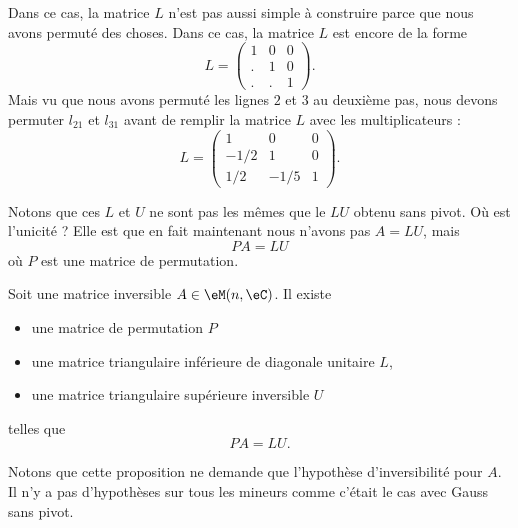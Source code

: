 Dans ce cas, la matrice \( L\) n'est pas aussi simple à construire parce que nous avons permuté des choses. Dans ce cas, la matrice \( L\) est encore de la forme
\begin{equation}
    L=\begin{pmatrix}
        1    &   0    &   0    \\
        .    &   1    &   0    \\
        .    &   .    &   1
    \end{pmatrix}.
\end{equation}
Mais vu  que nous avons permuté les lignes \( 2\) et \( 3\) au deuxième pas, nous devons permuter \( l_{21}\) et \( l_{31}\) avant de remplir la matrice \( L\) avec les multiplicateurs :
\begin{equation}
    L=\begin{pmatrix}
        1    &   0    &   0    \\
        -1/2    &   1    &   0    \\
        1/2    &  -1/5    &   1
    \end{pmatrix}.
\end{equation}

Notons que ces \( L\) et \( U\) ne sont pas les mêmes que le \( L U\) obtenu sans pivot. Où est l'unicité ? Elle est que en fait maintenant nous n'avons pas \( A=LU\), mais
\begin{equation}
    PA=LU
\end{equation}
où \( P\) est une matrice de permutation. 

\begin{proposition}
    Soit une matrice inversible \( A\in\eM(n,\eC)\). Il existe
    \begin{itemize}
        \item une matrice de permutation \( P\)
        \item une matrice triangulaire inférieure de diagonale unitaire \( L\),
        \item une matrice triangulaire supérieure inversible \( U\)
    \end{itemize}
    telles que
    \begin{equation}
        PA=LU.
    \end{equation}
\end{proposition}
Notons que cette proposition ne demande que l'hypothèse d'inversibilité pour \( A\). Il n'y a pas d'hypothèses sur tous les mineurs comme c'était le cas avec Gauss sans pivot.

